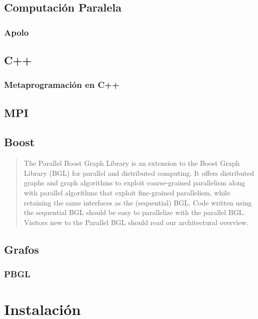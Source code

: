 \documentclass[twoside,letterpaper,12pt]{report}
\begin{document}
\section{Computación Paralela}

\cite{PCI}
\cite{SC}

\subsection{Apolo}

\section{C++}
\subsection{Metaprogramación en C++}

\section{MPI}


\section{Boost}

\begin{quotation}
The Parallel Boost Graph Library is an extension to the Boost Graph Library (BGL) for parallel and distributed computing. It offers distributed graphs and graph algorithms to exploit coarse-grained parallelism along with parallel algorithms that exploit fine-grained parallelism, while retaining the same interfaces as the (sequential) BGL. Code written using the sequential BGL should be easy to parallelize with the parallel BGL. Visitors new to the Parallel BGL should read our architectural overview.\cite{wwwBoost} 
\end{quotation} 

\section{Grafos}
\subsection{PBGL}


\chapter{Instalación}
\end{document}
